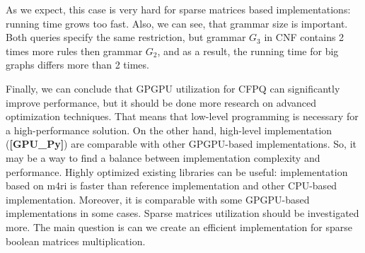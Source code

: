 As we expect, this case is very hard for sparse matrices based implementations: running time grows too fast.
Also, we can see, that grammar size is important.
Both queries specify the same restriction, but grammar $G_3$ in CNF contains 2 times more rules then grammar $G_2$, and as a result, the running time for big graphs differs more than 2 times.

Finally, we can conclude that GPGPU utilization for CFPQ can significantly improve performance, but it should be done more research on advanced optimization techniques.
That means that low-level programming is necessary for a high-performance solution.
On the other hand, high-level implementation (\textbf{[GPU\_Py]}) are comparable with other GPGPU-based implementations.
So, it may be a way to find a balance between implementation complexity and performance.
Highly optimized existing libraries can be useful: implementation based on m4ri is faster than reference implementation and other CPU-based implementation.
Moreover, it is comparable with some GPGPU-based implementations in some cases.
Sparse matrices utilization should be investigated more.
The main question is can we create an efficient implementation for sparse boolean matrices multiplication.

